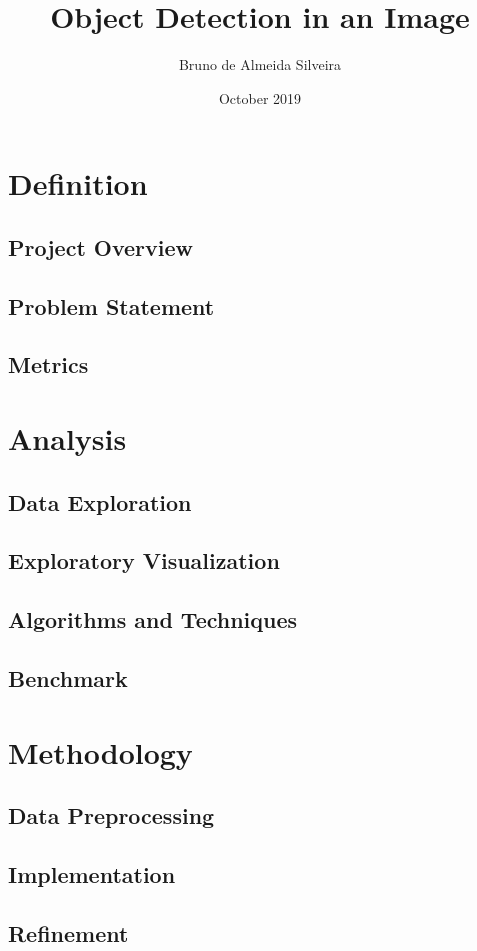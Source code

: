 \documentclass[11pt, a4paper, onecolumn]{article}
\title{\textbf{Object Detection in an Image}}
\author{Bruno de Almeida Silveira}
\date{October 2019}
\begin{document}
\maketitle

\section{Definition}
\subsection{Project Overview}
\subsection{Problem Statement}
\subsection{Metrics}
\section{Analysis}
\subsection{Data Exploration}
\subsection{Exploratory Visualization}
\subsection{Algorithms and Techniques}
\subsection{Benchmark}
\section{Methodology}
\subsection{Data Preprocessing}
\subsection{Implementation}
\subsection{Refinement}
\end{document}
